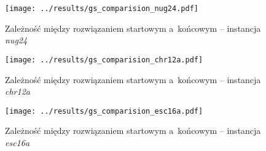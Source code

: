 \documentclass{article}
\begin{document}
			\begin{figure}[h]
				\texttt{[image: ../results/gs\_comparision\_nug24.pdf]}
				\caption{Zależność między rozwiązaniem startowym a~końcowym -- instancja \emph{nug24}\label{fig:gs.nug24}}				
			\end{figure}
			
			\begin{figure}[h]
				\texttt{[image: ../results/gs\_comparision\_chr12a.pdf]}
				\caption{Zależność między rozwiązaniem startowym a~końcowym -- instancja \emph{chr12a}\label{fig:gs.chr12a}}				
			\end{figure}
			
			\begin{figure}[h]
				\texttt{[image: ../results/gs\_comparision\_esc16a.pdf]}
				\caption{Zależność między rozwiązaniem startowym a~końcowym -- instancja \emph{esc16a}\label{fig:gs.esc16a}}				
			\end{figure}
		
\end{document}
